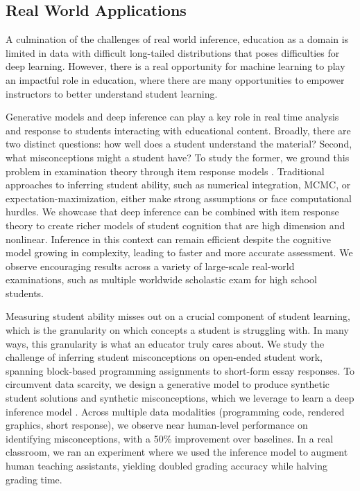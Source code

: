 \subsection{Real World Applications}

A culmination of the challenges of real world inference, education as a domain is limited in data with difficult long-tailed distributions \cite{wu2018zero,malik2019generative} that poses difficulties for deep learning. However, there is a real opportunity for machine learning to play an impactful role in education, where there are many opportunities to empower instructors to better understand student learning. 

Generative models and deep inference can play a key role in real time analysis and response to students interacting with educational content. Broadly, there are two distinct questions: how well does a student understand the material? Second, what misconceptions might a student have? To study the former, we ground this problem in examination theory through item response models \cite{wu2020variational,wu2021modeling}. Traditional approaches to inferring student ability, such as numerical integration, MCMC, or expectation-maximization, either make strong assumptions or face computational hurdles. We showcase that deep inference can be combined with item response theory to create richer models of student cognition that are high dimension and nonlinear. Inference in this context can remain efficient despite the cognitive model growing in complexity, leading to faster and more accurate assessment. We observe encouraging results across a variety of large-scale real-world examinations, such as multiple worldwide scholastic exam for high school students.

Measuring student ability misses out on a crucial component of student learning, which is the granularity on which concepts a student is struggling with. In many ways, this granularity is what an educator truly cares about. We study the challenge of inferring student misconceptions on open-ended student work, spanning block-based programming assignments to short-form essay responses. To circumvent data scarcity, we design a generative model to produce synthetic student solutions and synthetic misconceptions, which we leverage to learn a deep inference model \cite{wu2018zero,malik2019generative}. Across multiple data modalities (programming code, rendered graphics, short response), we observe near human-level performance on identifying misconceptions, with a 50\% improvement over baselines. In a real classroom, we ran an experiment where we used the inference model to augment human teaching assistants, yielding doubled grading accuracy while halving grading time.


